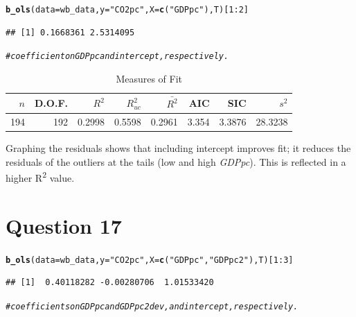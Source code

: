 \documentclass[english, 11pt]{article}\usepackage[]{graphicx}\usepackage[]{color}
\makeatletter
\newcommand{\hlnum}[1]{\textcolor[rgb]{0.686,0.059,0.569}{#1}}%
\newcommand{\hlstr}[1]{\textcolor[rgb]{0.192,0.494,0.8}{#1}}%
\newcommand{\hlcom}[1]{\textcolor[rgb]{0.678,0.584,0.686}{\textit{#1}}}%
\newcommand{\hlopt}[1]{\textcolor[rgb]{0,0,0}{#1}}%
\newcommand{\hlstd}[1]{\textcolor[rgb]{0.345,0.345,0.345}{#1}}%
\newcommand{\hlkwc}[1]{\textcolor[rgb]{0.333,0.667,0.333}{#1}}%
\newcommand{\hlkwd}[1]{\textcolor[rgb]{0.737,0.353,0.396}{\textbf{#1}}}%
\newenvironment{kframe}{%
 \def\at@end@of@kframe{}%
 \ifinner\ifhmode%
  \def\at@end@of@kframe{\end{minipage}}%
  \begin{minipage}{\columnwidth}%
 \fi\fi%
 \def\FrameCommand##1{\hskip\@totalleftmargin \hskip-\fboxsep
 \colorbox{shadecolor}{##1}\hskip-\fboxsep
     \hskip-\linewidth \hskip-\@totalleftmargin \hskip\columnwidth}%
 \MakeFramed {\advance\hsize-\width
   \@totalleftmargin\z@ \linewidth\hsize
   \@setminipage}}%
 {\par\unskip\endMakeFramed%
 \at@end@of@kframe}
\newenvironment{knitrout}{}{} %
\makeatother
\begin{document}
\begin{knitrout}\small
{}\color{fgcolor}\begin{kframe}
\begin{alltt}
\hlkwd{b_ols}\hlstd{(}\hlkwc{data} \hlstd{= wb_data,} \hlkwc{y}\hlstd{=}\hlstr{"CO2pc"}\hlstd{,} \hlkwc{X}\hlstd{=}\hlkwd{c}\hlstd{(}\hlstr{"GDPpc"}\hlstd{), T)[}\hlnum{1}\hlopt{:}\hlnum{2}\hlstd{]}
\end{alltt}
\begin{verbatim}
## [1] 0.1668361 2.5314095
\end{verbatim}
\begin{alltt}
\hlcom{#coefficient on GDPpc and intercept, respectively. }
\end{alltt}
\end{kframe}
\end{knitrout}

\begin{knitrout}
\color{fgcolor}\begin{table}[!h]

\caption{\label{tab:Q.16 table}Measures of Fit}
\centering
\begin{tabular}[t]{rrrrrrrr}
\toprule
$n$ & D.O.F. & $R^2$ & $R^2_{uc}$ & $\bar{R^2}$ & AIC & SIC & $s^2$\\
\midrule
194 & 192 & 0.2998 & 0.5598 & 0.2961 & 3.354 & 3.3876 & 28.3238\\
\bottomrule
\end{tabular}
\end{table}


\end{knitrout}

\noindent Graphing the residuals shows that including intercept improves fit; it reduces the residuals of the outliers at the tails (low and high \textit{GDPpc}). This is reflected in a higher R\textsuperscript{2} value.


\noindent \section*{Question 17} 

  
\begin{knitrout}\small
{}\color{fgcolor}\begin{kframe}
\begin{alltt}
\hlkwd{b_ols}\hlstd{(}\hlkwc{data} \hlstd{= wb_data,} \hlkwc{y}\hlstd{=}\hlstr{"CO2pc"}\hlstd{,} \hlkwc{X}\hlstd{=}\hlkwd{c}\hlstd{(}\hlstr{"GDPpc"}\hlstd{,} \hlstr{"GDPpc2"}\hlstd{), T)[}\hlnum{1}\hlopt{:}\hlnum{3}\hlstd{]}
\end{alltt}
\begin{verbatim}
## [1]  0.40118282 -0.00280706  1.01533420
\end{verbatim}
\begin{alltt}
\hlcom{#coefficients on GDPpc and GDPpc2dev, and intercept, respectively. }
\end{alltt}
\end{kframe}
\end{knitrout}
\end{document}
